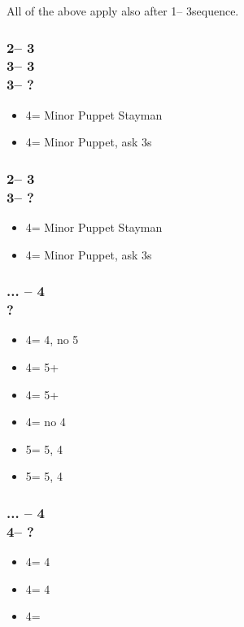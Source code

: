 \documentclass[12pt, a4paper]{report}
\begin{document}
{{{            All of the above apply also after 1\nt -- 3\clubs sequence.

            \subsubsection*{2\nt -- 3\diams\\
                            3\hearts -- 3\spades\\
                            3\nt -- ?}
            \begin{itemize}
                \item 4\clubs = Minor Puppet Stayman
                \item 4\diams = Minor Puppet, ask 3s
            \end{itemize}

            \subsubsection*{2\nt -- 3\hearts\\
                            3\spades -- ?}
            \begin{itemize}
                \item 4\clubs = Minor Puppet Stayman
                \item 4\diams = Minor Puppet, ask 3s
            \end{itemize}

            \subsubsection*{... -- 4\clubs\\
                            ?}
            \begin{itemize}
                \item 4\diams = 4\minor, no 5\minor
                \item 4\hearts = 5+\clubs
                \item 4\spades = 5+\diams
                \item 4\nt = no 4\minor
                \item 5\clubs = 5\clubs, 4\diams
                \item 5\diams = 5\diams, 4\clubs
            \end{itemize}

            \subsubsection*{... -- 4\clubs\\
                            4\diams -- ?}
            \begin{itemize}
                \item 4\hearts = 4\clubs
                \item 4\spades = 4\diams
                \item 4\nt = \soff
            \end{itemize}

}}}
\end{document}
